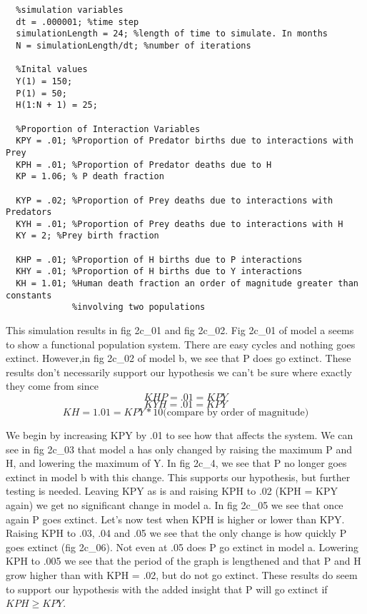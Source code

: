 \documentclass{article}
\begin{document}
\begin{verbatim}
  %simulation variables
  dt = .000001; %time step
  simulationLength = 24; %length of time to simulate. In months
  N = simulationLength/dt; %number of iterations

  %Inital values
  Y(1) = 150;
  P(1) = 50;
  H(1:N + 1) = 25;

  %Proportion of Interaction Variables
  KPY = .01; %Proportion of Predator births due to interactions with Prey
  KPH = .01; %Proportion of Predator deaths due to H
  KP = 1.06; % P death fraction

  KYP = .02; %Proportion of Prey deaths due to interactions with Predators
  KYH = .01; %Proportion of Prey deaths due to interactions with H
  KY = 2; %Prey birth fraction

  KHP = .01; %Proportion of H births due to P interactions
  KHY = .01; %Proportion of H births due to Y interactions
  KH = 1.01; %Human death fraction an order of magnitude greater than constants
             %involving two populations
\end{verbatim}

This simulation results in fig 2c\_01 and fig 2c\_02. Fig 2c\_01 of model a
seems to show a functional population system. There are easy cycles and nothing goes
extinct. However,in fig 2c\_02 of model b, we see that P does go extinct. These results
don't necessarily support our hypothesis we can't be sure where exactly they come from
since\\

\[
  KHP = .01 = KPY
\]
\[
  KYH = .01 = KPY
\]
\[
  KH = 1.01 = KPY * 10 \text{(compare by order of magnitude)}
\]

We begin by increasing KPY by .01 to see how that affects the system. We can see
in fig 2c\_03 that model a has only changed by raising the maximum P and H, and lowering
the maximum of Y. In fig 2c\_4, we see that P no longer goes extinct in model b with this
change. This supports our hypothesis, but further testing is needed. Leaving KPY as is
and raising KPH to .02 (KPH = KPY again) we get no significant change in model a.
 In fig 2c\_05 we see that once
again P goes extinct. Let's now test when KPH is higher or lower than KPY. Raising KPH
to .03, .04 and .05 we see that the only change is how quickly P goes extinct (fig 2c\_06).
Not even at .05 does P go extinct in model a.
Lowering KPH  to .005 we see that the period of the graph is lengthened and that P and H
grow higher than with KPH = .02, but do not go extinct. These results do seem to support
our hypothesis with the added insight that P will go extinct if $KPH \ge KPY$.\\
\end{document}
